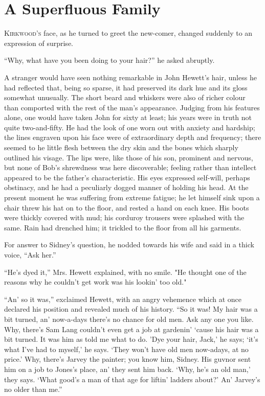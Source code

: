 \chapter{A Superfluous Family}

\textsc{Kirkwood's} face, as he turned to greet the new-comer, changed
suddenly to an expression of surprise.

``Why, what have you been doing to your hair?'' he asked abruptly.

A stranger would have seen nothing remarkable in John Hewett's hair,
unless he had reflected that, being so sparse, it had preserved its dark
hue and its gloss somewhat unusually. The short beard and whiskers were
also of richer colour than comported with the rest of the man's
appearance. Judging from his features alone, one would have taken John
for sixty at least; his years were in truth not quite two-and-fifty. He
had the look of one worn out with anxiety {}and hardship; the lines
engraven upon his face were of extraordinary depth and frequency; there
seemed to he little flesh between the dry skin and the bones which
sharply outlined his visage. The lips were, like those of his son,
prominent and nervous, but none of Bob's shrewdness was here
discoverable; feeling rather than intellect appeared to be the father's
characteristic. His eyes expressed self-will, perhaps obstinacy, and he
had a peculiarly dogged manner of holding his head. At the present
moment he was suffering from extreme fatigue; he let himself sink upon a
chair threw his hat on to the floor, and rested a hand on each knee. His
boots were thickly covered with mud; his corduroy trousers were splashed
with the same. Rain had drenched him; it trickled to the floor from all
his garments.

For answer to Sidney's question, he nodded towards his wife and said in
a thick voice, ``Ask her.''

``He's dyed it,'' Mrs. Hewett explained, with no smile. "He thought one
of the {}reasons why he couldn't get work was his lookin' too old."

``An' so it was,'' exclaimed Hewett, with an angry vehemence which at
once declared his position and revealed much of his history. ``So it
was! My hair was a bit turned, an' now-a-days there's no chance for old
men. Ask any one you like. Why, there's Sam Lang couldn't even get a job
at gardenin' `cause his hair was a bit turned. It was him as told me
what to do. 'Dye your hair, Jack,' he says; `it's what I've had to
myself,' he says. `They won't have old men now-adays, at no price.' Why,
there's Jarvey the painter; you know him, Sidney. His guvnor sent him on
a job to Jones's place, an' they sent him back. `Why, he's an old man,'
they says. `What good's a man of that age for liftin' ladders about?'
An' Jarvey's no older than me.''


